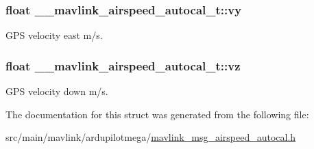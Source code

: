 \hypertarget{struct____mavlink__airspeed__autocal__t_a5b3f6cf7a18802ea9a2dd3fe502f8ec4}{
\subsubsection[{vy}]{\setlength{\rightskip}{0pt plus 5cm}float \+\_\+\+\_\+mavlink\+\_\+airspeed\+\_\+autocal\+\_\+t\+::vy}}\label{struct____mavlink__airspeed__autocal__t_a5b3f6cf7a18802ea9a2dd3fe502f8ec4}


G\+P\+S velocity east m/s. 

\hypertarget{struct____mavlink__airspeed__autocal__t_a9d0d32bc5b09880e3ced7586c2e0da2b}{
\subsubsection[{vz}]{\setlength{\rightskip}{0pt plus 5cm}float \+\_\+\+\_\+mavlink\+\_\+airspeed\+\_\+autocal\+\_\+t\+::vz}}\label{struct____mavlink__airspeed__autocal__t_a9d0d32bc5b09880e3ced7586c2e0da2b}


G\+P\+S velocity down m/s. 



The documentation for this struct was generated from the following file\+:\begin{DoxyCompactItemize}
\item 
src/main/mavlink/ardupilotmega/\hyperlink{mavlink__msg__airspeed__autocal_8h}{mavlink\+\_\+msg\+\_\+airspeed\+\_\+autocal.\+h}\end{DoxyCompactItemize}
